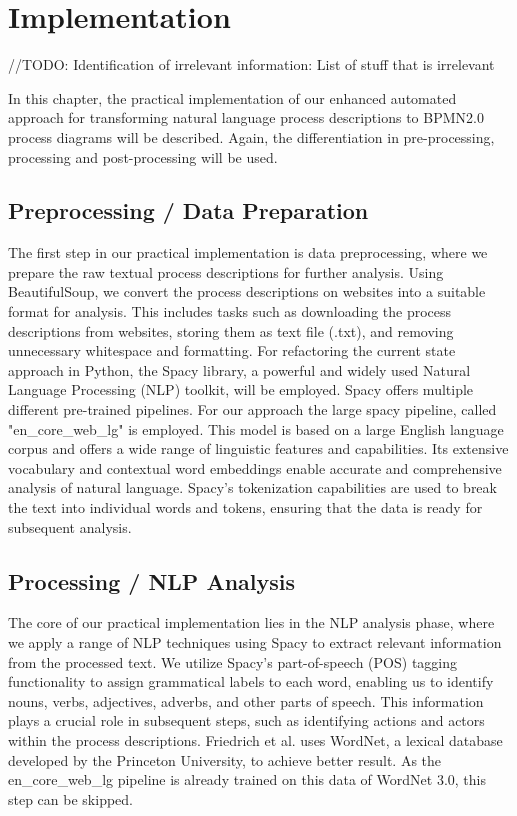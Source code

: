 \chapter{Implementation}
\label{sec:implementation}


//TODO: Identification of irrelevant information: List of stuff that is irrelevant


In this chapter, the practical implementation of our enhanced automated approach for transforming natural language process descriptions to BPMN2.0 process diagrams will be described. Again, the differentiation in pre-processing, processing and post-processing will be used.

\section{Preprocessing / Data Preparation} 
The first step in our practical implementation is data preprocessing, where we prepare the raw textual process descriptions for further analysis. Using BeautifulSoup, we convert the process descriptions on websites into a suitable format for analysis. This includes tasks such as downloading the process descriptions from websites, storing them as text file (.txt), and removing unnecessary whitespace and formatting. For refactoring the current state approach in Python, the Spacy library, a powerful and widely used Natural Language Processing (NLP) toolkit, will be employed. Spacy offers multiple different pre-trained pipelines. For our approach the large spacy pipeline, called "en\_core\_web\_lg" is employed. This model is based on a large English language corpus and offers a wide range of linguistic features and capabilities. Its extensive vocabulary and contextual word embeddings enable accurate and comprehensive analysis of natural language. Spacy’s tokenization capabilities are used to break the text into individual words and tokens, ensuring that the data is ready for subsequent analysis.

\section{Processing / NLP Analysis}
The core of our practical implementation lies in the NLP analysis phase, where we apply a range of NLP techniques using Spacy to extract relevant information from the processed text. We utilize Spacy’s part-of-speech (POS) tagging functionality to assign grammatical labels to each word, enabling us to identify nouns, verbs, adjectives, adverbs, and other parts of speech. This information plays a crucial role in subsequent steps, such as identifying actions and actors within the process descriptions. Friedrich et al. uses WordNet, a lexical database developed by the Princeton University, to achieve better result. As the en\_core\_web\_lg pipeline is already trained on this data of WordNet 3.0, this step can be skipped.

